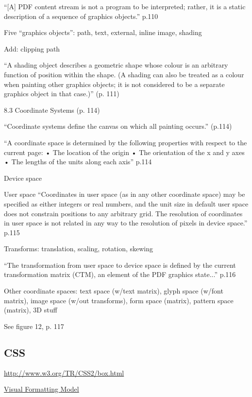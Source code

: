 \documentclass[reqno,12pt]{tufte-handout}
\numberwithin{equation}{subsection}
\numberwithin{equation}{subsection}
\begin{document}
\begin{appendices}
    ``[A] PDF content stream is not a program to be interpreted; rather, it is a static description of a sequence of graphics objects.'' p.110

    Five ``graphics objects'': path, text, external, inline image, shading

    Add: clipping path

    ``A shading object describes a geometric shape whose colour is an arbitrary function of position within the shape. (A shading can also be treated as a colour when painting other graphics objects; it is not considered to be a separate graphics object in that case.)'' (p. 111)


    8.3 Coordinate Systems (p. 114)

    ``Coordinate systems define the canvas on which all painting occurs.'' (p.114)

    ``A coordinate space is determined by the following properties with respect to the current page:
    • The location of the origin
    • The orientation of the x and y axes
    • The lengths of the units along each axis'' p.114

    Device space

    User space
    ``Coordinates in user space (as in any other coordinate space) may be specified as either integers or real numbers, and the unit size in default user space does not constrain positions to any arbitrary grid. The resolution of coordinates in user space is not related in any way to the resolution of pixels in device space.'' p.115

    Transforms: translation, scaling, rotation, skewing


    ``The transformation from user space to device space is defined by the current transformation matrix (CTM), an element of the PDF graphics state...'' p.116

    Other coordinate spaces: text space (w/text matrix), glyph space
    (w/font matrix), image space (w/out transforms), form space (matrix),
    pattern space (matrix), 3D stuff

    See figure 12, p. 117

    \subsection{CSS}

    \url{http://www.w3.org/TR/CSS2/box.html}

    \href{http://www.w3.org/TR/CSS2/visuren.html}{Visual Formatting Model}


\end{appendices}
\end{document}
